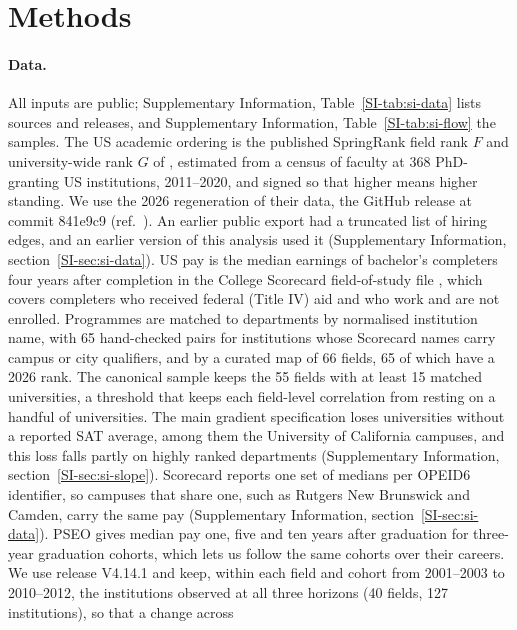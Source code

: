 \documentclass[11pt]{article}
\newcommand{\SIsec}[1]{Supplementary Information, section~\ref{SI-#1}}
\newcommand{\SItab}[1]{Supplementary Information, Table~\ref{SI-#1}}
\begin{document}
\section*{Methods}

\paragraph{Data.} All inputs are public; \SItab{tab:si-data} lists sources and releases, and \SItab{tab:si-flow} the
samples. The US academic ordering is the published SpringRank \citep{debacco2018physical} field rank $F$ and
university-wide rank $G$ of \citet{wapman2022quantifying}, estimated from a census of faculty at 368 PhD-granting US
institutions, 2011--2020, and signed so that higher means higher standing. We use the 2026 regeneration of their
data, the GitHub release at commit 841e9c9 (ref.~). An earlier public export \citep{wapman2022data} had
a truncated list of hiring edges, and an earlier version of this analysis used it (\SIsec{sec:si-data}). US pay is the median
earnings of bachelor's completers four years after completion in the College Scorecard field-of-study file
\citep{scorecard}, which covers completers who received federal (Title IV) aid and who work and are not enrolled.
Programmes are matched to departments by normalised institution name, with 65 hand-checked pairs for institutions whose
Scorecard names carry campus or city qualifiers, and by a curated map of 66 fields, 65 of which have a 2026 rank. The
canonical sample keeps the 55 fields with at least 15 matched universities, a threshold that keeps each field-level
correlation from resting on a handful of universities. The main gradient specification loses universities without a
reported SAT average, among them the University of California campuses, and this loss falls partly on highly ranked
departments (\SIsec{sec:si-slope}). Scorecard reports one set of medians per OPEID6 identifier, so campuses that share
one, such as Rutgers New Brunswick and Camden, carry the same pay (\SIsec{sec:si-data}). PSEO \citep{pseo, pseo2026}
gives median pay one, five and ten years after graduation for three-year graduation cohorts, which lets us follow the
same cohorts over their careers. We use release V4.14.1 and keep, within each field and cohort from 2001--2003 to
2010--2012, the institutions observed at all three horizons (40 fields, 127 institutions), so that a change across
\end{document}
